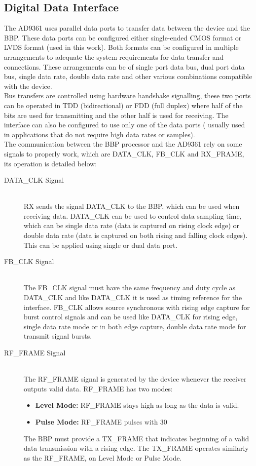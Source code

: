 \subsection{Digital Data Interface}

The AD9361 uses parallel data ports to transfer data between the device and the BBP. These data ports can be configured either single-ended CMOS format or LVDS format (used in this work). Both formats can be configured in multiple arrangements to adequate the system requirements for data transfer and connections. These arrangements can be of single port data bus, dual port data bus, single data rate, double data rate and other various combinations compatible with the device.\\
Bus transfers are controlled using hardware handshake signalling, these two ports can be operated in TDD (bidirectional) or FDD (full duplex) where half of the bits are used for transmitting and the other half is used for receiving. The interface can also be configured to use only one of the data ports ( usually used in applications that do not require high data rates or samples).\\
The communication between the BBP processor and the AD9361 rely on some signals to properly work, which are DATA\_CLK, FB\_CLK and RX\_FRAME, its operation is detailed below:

\begin{description}
	\item[DATA\_CLK Signal] \hfill \\
	RX sends the signal DATA\_CLK to the BBP, which can be used when receiving data. DATA\_CLK can be used to control data sampling time, which can be single data rate (data is captured on rising clock edge) or double data rate (data is captured on both rising and falling clock edges). This can be applied using single or dual data port.

	\item[FB\_CLK Signal] \hfill \\
	The FB\_CLK signal must have the same frequency and duty cycle as DATA\_CLK and like DATA\_CLK it is used as timing reference for the interface. FB\_CLK allows source synchronous with rising edge capture for burst control signals and can be used like DATA\_CLK for rising edge, single data rate mode or in both edge capture, double data rate mode for transmit signal bursts.

	\item[RF\_FRAME Signal] \hfill \\
	The RF\_FRAME signal is generated by the device whenever the receiver outputs valid data. RF\_FRAME has two modes:
	\begin{itemize}
		\item \textbf{Level Mode:} RF\_FRAME stays high as long as the data is valid.
		\item \textbf{Pulse Mode:} RF\_FRAME pulses with 30%
	\end{itemize}
	The BBP must provide a TX\_FRAME that indicates beginning of a valid data transmission with a rising edge. The TX\_FRAME operates similarly as the RF\_FRAME, on Level Mode or Pulse Mode.

\end{description}

